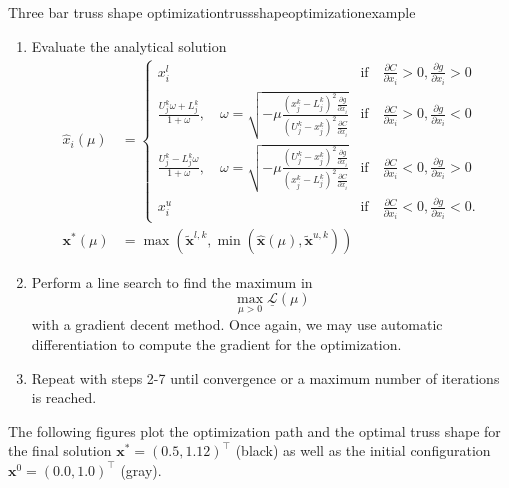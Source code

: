 \begin{example}{Three bar truss shape optimization}{trussshapeoptimizationexample}
\begin{enumerate}
        \item Evaluate the analytical solution
            \begin{align}
                \hat{x}_i(\mu) &= 
                \begin{cases}
                    x^l_i 
                        &\textrm{if} \quad \frac{\partial C}{\partial x_i} > 0, \frac{\partial g}{\partial x_i} > 0 \\
                    \frac{U_j^k\omega + L_j^k}{1+\omega}, \quad \omega = \sqrt{-\mu\frac{(x_j^k-L_j^k)^2\frac{\partial g}{\partial x_i}}{(U_j^k-x_j^k)^2\frac{\partial C}{\partial x_i}}}
                        &\textrm{if} \quad \frac{\partial C}{\partial x_i}  > 0, \frac{\partial g}{\partial x_i} <0\\
                    \frac{U_j^k-L_j^k\omega}{1+\omega}, \quad \omega = \sqrt{-\mu\frac{(U_j^k-x_j^k)^2\frac{\partial g}{\partial x_i}}{(x_j^k-L_j^k)^2\frac{\partial C}{\partial x_i}}} 
                        &\textrm{if} \quad \frac{\partial C}{\partial x_i} < 0, \frac{\partial g}{\partial x_i}  > 0\\
                    x^u_i 
                        &\textrm{if} \quad \frac{\partial C}{\partial x_i}< 0, \frac{\partial g}{\partial x_i} < 0.
                \end{cases} \\
                \mathbf{x}^* (\mu) &= \max\left(\tilde{\mathbf{x}}^{l,k}, \min \left(\hat{\mathbf{x}}(\mu), \tilde{\mathbf{x}}^{u,k} \right)\right)
            \end{align}
        \item Perform a line search to find the maximum in 
            \begin{equation}
                \max_{\mu>0} \underline{\mathcal{L}}(\mu)
            \end{equation}
            with a gradient decent method. Once again, we may use automatic differentiation to compute the gradient for the optimization.
        \item Repeat with steps 2-7 until convergence or a maximum number of iterations is reached.
    \end{enumerate}
    
    The following figures plot the optimization path and the optimal truss shape for the final solution $\mathbf{x}^* = (0.5, 1.12)^\top$ (black) as well as the initial configuration $\mathbf{x}^0 = (0.0, 1.0)^\top$ (gray).


\end{example}
